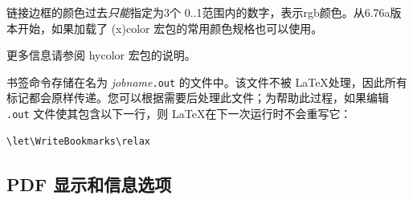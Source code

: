 \documentclass{article}
\newcommand*{\xpackage}[1]{\textsf{#1}}
\begin{document}
链接边框的颜色过去\emph{只能}指定为3个
0..1范围内的数字，表示rgb颜色。从6.76a版本开始，如果加载了
\xpackage{(x)color} 宏包的常用颜色规格也可以使用。

更多信息请参阅 \xpackage{hycolor} 宏包的说明。

书签命令存储在名为 \textit{jobname}\texttt{.out} 的文件中。该文件不被 \LaTeX 处理，因此所有标记都会原样传递。您可以根据需要后处理此文件；为帮助此过程，如果编辑 \texttt{.out} 文件使其包含以下一行，则 \LaTeX 在下一次运行时不会重写它：
\begin{verbatim}
\let\WriteBookmarks\relax
\end{verbatim}

\subsection{PDF 显示和信息选项}\label{sec:pdfdata}
\end{document}

